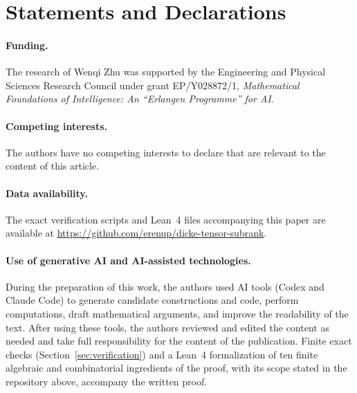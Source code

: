 \documentclass[10pt,a4paper]{article}
\theoremstyle{definition}
\theoremstyle{remark}
\numberwithin{equation}{section}
\begin{document}






\section*{Statements and Declarations}
\paragraph{Funding.}
The research of Wenqi Zhu was supported by the Engineering and Physical
Sciences Research Council under grant EP/Y028872/1, \emph{Mathematical
Foundations of Intelligence: An ``Erlangen Programme'' for AI}.

\paragraph{Competing interests.}
The authors have no competing interests to declare that are relevant to
the content of this article.

\paragraph{Data availability.}
The exact verification scripts and Lean~4 files accompanying
this paper are available at
\url{https://github.com/erenup/dicke-tensor-subrank}.

\paragraph{Use of generative AI and AI-assisted technologies.}
During the preparation of this work, the authors used AI tools (Codex and Claude Code) to generate candidate constructions and code, perform computations, draft mathematical arguments, and improve the readability of the text. After using these
tools, the authors reviewed and edited the content as needed and take full
responsibility for the content of the publication. Finite exact checks (Section~\ref{sec:verification}) and a Lean~4 formalization of ten finite algebraic and combinatorial ingredients of the proof, with its scope stated in the repository above, accompany the written proof.



\end{document}
